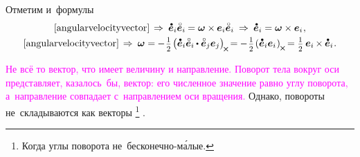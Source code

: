 \begin{otherlanguage}{russian}
\vspace{-0.25em}
Отметим и~формулы
\nopagebreak\vspace{.16em}\begin{equation}\label{angularvelocityandbasisvectors}
\begin{array}{c}
\eqref{angularvelocityvector} \hspace{.32ex} \Rightarrow\:
\mathdotabove{\bm{e}}_i \mathcircabove{\bm{e}}_i \hspace{-0.1ex} = \bm{\omega} \times \hspace{-0.1ex} \bm{e}_i \mathcircabove{\bm{e}}_i \:\Rightarrow\:
\mathdotabove{\bm{e}}_i = \bm{\omega} \times \bm{e}_i \hspace{.12ex},
\\[.32em]
%
\eqref{angularvelocityvector} \hspace{.32ex} \Rightarrow\:
\bm{\omega} = \hspace{-0.1ex} - \hspace{.16ex} \smalldisplaystyleonehalf \hspace{-.2ex} \left( \mathdotabove{\bm{e}}_i \mathcircabove{\bm{e}}_i \hspace{-0.1ex} \dotp \mathcircabove{\bm{e}}_j \bm{e}_j \right)_{\hspace{-0.25ex}\Xcompanion} \hspace{-0.32ex}
= \hspace{-0.1ex} - \hspace{.16ex} \smalldisplaystyleonehalf \hspace{-.2ex} \left( \mathdotabove{\bm{e}}_i \bm{e}_i \hspace{.1ex} \right)_{\hspace{-0.1ex}\Xcompanion} \hspace{-0.25ex}
= \smalldisplaystyleonehalf \hspace{.4ex} \bm{e}_i \hspace{-0.16ex} \times \hspace{-0.1ex} \mathdotabove{\bm{e}}_i
\hspace{.12ex} .
\end{array}
\end{equation}


\textcolor{magenta}{Не всё то вектор, что имеет величину и направление.
Поворот тела вокруг оси представляет, казалось~бы, вектор:
его численное значение равно углу поворота, а~направление совпадает с~направлением оси вращения.}
Однако, повороты не~складываются как векторы%
\footnote{Когда углы поворота не~бесконечно-м\'{а}лые.}%
\hbox{\hspace{-0.5ex}.}


\end{otherlanguage}
